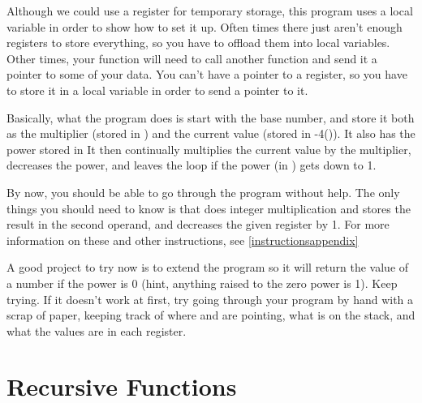 Although we could use a register for temporary storage, this
program uses a 
local variable
in order to show how to set it
up.  Often times there just aren't enough registers to store
everything, so you have to offload them into local variables.
Other times, your function will need to call another function
and send it a pointer to some of your data.  You can't have
a pointer 
to a register, 
so you have to store it in a 
local variable in order to send a pointer to it.

Basically, what the program does is start with the base number,
and store it both as the multiplier (stored in {\ebxReg}) and the 
current value (stored in -4({\ebpBare})).  It also has the power
stored in {\ecxReg}  It then continually 
multiplies the current value by the multiplier, decreases 
the power, and leaves the loop if the power (in {\ecxReg}) gets down to 1.

By now, you should be able to go through the program without
help.  The only things you should need to know is that
 does integer multiplication and stores
the result in the second operand, and 
decreases the given register by 1.  For more information on these
and other instructions, see \autoref{instructionsappendix}

A good project to try now is to extend the program so it
will return the value of a number if the power is 0 (hint,
anything raised to the zero power is 1).  Keep trying.
If it doesn't work at first, try going through your program
by hand with a scrap of paper, keeping track of where
{\ebpReg} and {\espReg} are pointing, what is on the stack, and what the
values are in each register.

\section{Recursive Functions}
\label{recursivefunctions}

